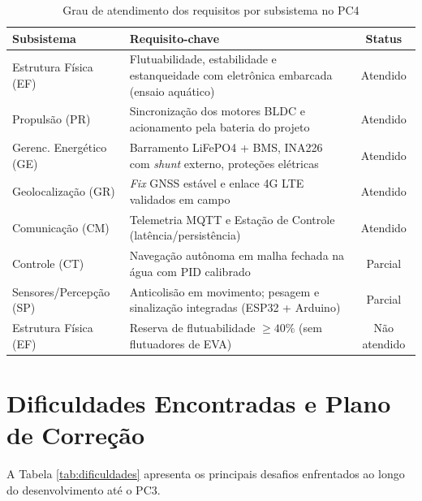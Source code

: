 \documentclass[12pt,a4paper]{article}
\begin{document}
\begin{table}[H]
\centering
\caption{Grau de atendimento dos requisitos por subsistema no PC4}
\label{tab:atendimento}
\renewcommand{\arraystretch}{1.3}
\small
\begin{tabularx}{\textwidth}{|p{3.2cm}|X|c|}
\hline
\rowcolor{gray!20}
\textbf{Subsistema} & \textbf{Requisito-chave} & \textbf{Status} \\ \hline
Estrutura Física (EF) & Flutuabilidade, estabilidade e estanqueidade com eletrônica embarcada (ensaio aquático) & Atendido \\ \hline
\rowcolor{gray!10}
Propulsão (PR) & Sincronização dos motores BLDC e acionamento pela bateria do projeto & Atendido \\ \hline
Gerenc. Energético (GE) & Barramento LiFePO4 + BMS, INA226 com \textit{shunt} externo, proteções elétricas & Atendido \\ \hline
\rowcolor{gray!10}
Geolocalização (GR) & \textit{Fix} GNSS estável e enlace 4G LTE validados em campo & Atendido \\ \hline
Comunicação (CM) & Telemetria MQTT e Estação de Controle (latência/persistência) & Atendido \\ \hline
\rowcolor{gray!10}
Controle (CT) & Navegação autônoma em malha fechada na água com PID calibrado & Parcial \\ \hline
Sensores/Percepção (SP) & Anticolisão em movimento; pesagem e sinalização integradas (ESP32 + Arduino) & Parcial \\ \hline
Estrutura Física (EF) & Reserva de flutuabilidade $\ge 40\%$ (sem flutuadores de EVA) & Não atendido \\ \hline
\end{tabularx}
\end{table}


\section{Dificuldades Encontradas e Plano de Correção}

A Tabela \ref{tab:dificuldades} apresenta os principais desafios enfrentados ao longo do desenvolvimento até o PC3.
\end{document}
